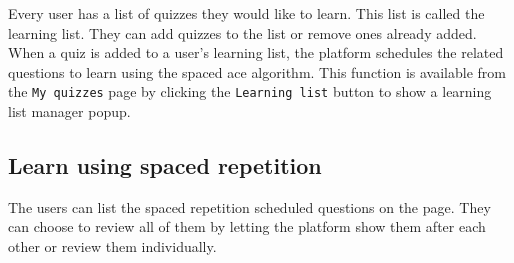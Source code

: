Every user has a list of quizzes they would like to learn. This list is called the learning list. They can add quizzes to the list or remove ones already added. When a quiz is added to a user's learning list, the platform schedules the related questions to learn using the spaced ace algorithm. This function is available from the \texttt{My quizzes} page by clicking the \texttt{Learning list} button to show a learning list manager popup.

\subsection{Learn using spaced repetition}

The users can list the spaced repetition scheduled questions on the  page. They can choose to review all of them by letting the platform show them after each other or review them individually.
